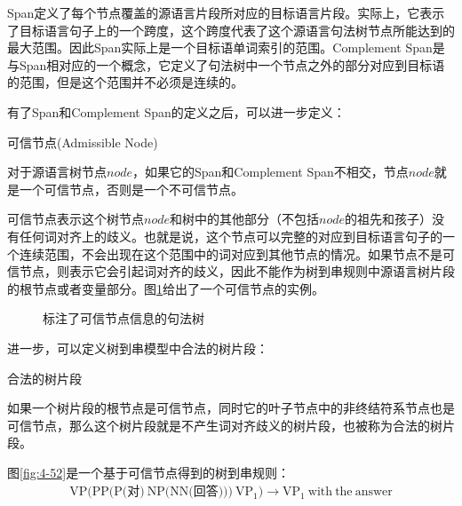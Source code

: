 \parinterval Span定义了每个节点覆盖的源语言片段所对应的目标语言片段。实际上，它表示了目标语言句子上的一个跨度，这个跨度代表了这个源语言句法树节点所能达到的最大范围。因此Span实际上是一个目标语单词索引的范围。Complement Span是与Span相对应的一个概念，它定义了句法树中一个节点之外的部分对应到目标语的范围，但是这个范围并不必须是连续的。

\parinterval 有了Span和Complement Span的定义之后，可以进一步定义：

\vspace{0.5em}
\begin{definition} 可信节点(Admissible Node)

{\small
对于源语言树节点$node$，如果它的Span和Complement Span不相交，节点$node$就是一个可信节点，否则是一个不可信节点。
}
\end{definition}

\parinterval 可信节点表示这个树节点$node$和树中的其他部分（不包括$node$的祖先和孩子）没有任何词对齐上的歧义。也就是说，这个节点可以完整的对应到目标语言句子的一个连续范围，不会出现在这个范围中的词对应到其他节点的情况。如果节点不是可信节点，则表示它会引起词对齐的歧义，因此不能作为树到串规则中源语言树片段的根节点或者变量部分。图\ref{fig:4-51}给出了一个可信节点的实例。

\begin{figure}[htp]
\centering

\caption{标注了可信节点信息的句法树}
\label{fig:4-51}
\end{figure}

\parinterval 进一步，可以定义树到串模型中合法的树片段：

\vspace{0.5em}
\begin{definition} 合法的树片段

{\small
如果一个树片段的根节点是可信节点，同时它的叶子节点中的非终结符系节点也是可信节点，那么这个树片段就是不产生词对齐歧义的树片段，也被称为合法的树片段。
}
\end{definition}

\parinterval 图\ref{fig:4-52}是一个基于可信节点得到的树到串规则：
\begin{eqnarray}
\textrm{VP(PP(P(对)}\ \textrm{NP(NN(回答)))}\ \textrm{VP}_1) \rightarrow \textrm{VP}_1\ \textrm{with}\ \textrm{the}\ \textrm{answer} \nonumber
\end{eqnarray}

